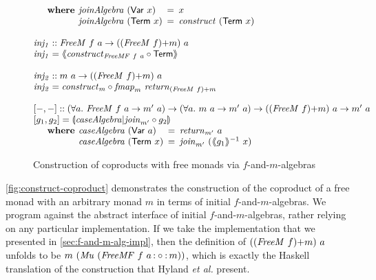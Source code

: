 \documentclass{jfp1}
\newcommand{\eFold}[2]{\llparenthesis #1|#2 \rrparenthesis}
\newcommand{\fmext}[1]{\langle\kern-0.25em\langle #1 \rangle\kern-0.25em\rangle}
\newcommand{\kw}[1]{\textbf{#1}}
\begin{document}
\begin{figure}
\begin{displaymath}
\begin{array}{@{}l}
\begin{array}{@{}l}
        \quad\begin{array}{r@{\hspace{0.4em}}l@{\hspace{0.5em}}c@{\hspace{0.5em}}l}
          \kw{where} & \mathit{joinAlgebra}~(\mathsf{Var}~x) &=& x \\
          & \mathit{joinAlgebra}~(\mathsf{Term}~x) &=& \mathit{construct}~(\mathsf{Term}~x)
        \end{array}
      \end{array} \\
      \\
      \mathit{inj_1} :: \mathit{FreeM}~f~a \to (\cprd{(\mathit{FreeM}~f)}{m})~a \\
      \mathit{inj_1} = \fmext{\mathit{construct}_{\mathit{FreeMF}~f~a} \circ \mathsf{Term}} \\
      \\
      \mathit{inj_2} :: m~a \to (\cprd{(\mathit{FreeM}~f)}{m})~a \\
      \mathit{inj_2} = \mathit{construct}_m \circ \mathit{fmap}_m~\mathit{return}_{\cprd{(\mathit{FreeM}~f)}{m}}\\
      \\
      \begin{array}{@{}l}
        {}[-,-] :: (\forall a.~\mathit{FreeM}~f~a \to m'~a) \to (\forall a.~m~a \to m'~a) \to (\cprd{(\mathit{FreeM}~f)}{m})~a \to m'~a \\
        {}[g_1,g_2] = \eFold{\mathit{caseAlgebra}}{\mathit{join}_{m'} \circ g_2} \\
        \quad\begin{array}{r@{\hspace{0.4em}}l@{\hspace{0.5em}}c@{\hspace{0.5em}}l}
          \kw{where} & \mathit{caseAlgebra}~(\mathsf{Var}~a) &=& \mathit{return}_{m'}~a \\
          & \mathit{caseAlgebra}~(\mathsf{Term}~x) &=& \mathit{join}_{m'}~(\fmext{g_1}^{-1}~x)
        \end{array}
      \end{array}
    \end{array}
  \end{displaymath}
  \caption{Construction of coproducts with free monads via $f$-and-$m$-algebras}
  \label{fig:construct-coproduct}
\end{figure}

\autoref{fig:construct-coproduct} demonstrates the construction of the
coproduct of a free monad with an arbitrary monad $m$ in terms of
initial $f$-and-$m$-algebras. We program against the abstract
interface of initial $f$-and-$m$-algebras, rather relying on any
particular implementation. If we take the implementation that we
presented in \autoref{sec:f-and-m-alg-impl}, then the definition of
$((\mathit{FreeM}~f)\mathord{+}m)~a$ unfolds to be
$m~(\mathit{Mu}~(\mathit{FreeMF}~f~a \mathop{\mathord:\circ\mathord:} m))$, which is exactly
the Haskell translation of the construction that Hyland \emph{et al.}
present.
\end{document}
